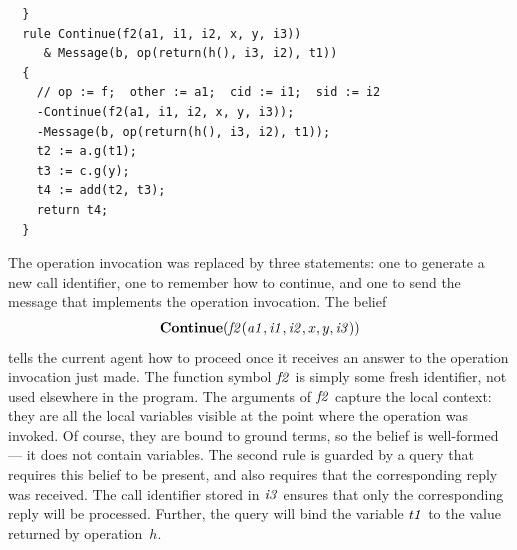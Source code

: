 \documentclass[a4paper,12pt,oneside,fleqn]{book} %
\begin{document}
\begin{example}
\begin{verbatim}
  }
  rule Continue(f2(a1, i1, i2, x, y, i3))
     & Message(b, op(return(h(), i3, i2), t1))
  {
    // op := f;  other := a1;  cid := i1;  sid := i2
    -Continue(f2(a1, i1, i2, x, y, i3));
    -Message(b, op(return(h(), i3, i2), t1));
    t2 := a.g(t1);
    t3 := c.g(y);
    t4 := add(t2, t3);
    return t4;
  }
\end{verbatim}
The operation invocation was replaced by three statements: one to generate
a new call identifier, one to remember how to continue, and one to send the
message that implements the operation invocation. The belief
\begin{align}
  {\bf Continue}
    ({\it f2}({\it a1}, {\it i1}, {\it i2}, x, y, {\it i3}))
\end{align}
tells the current agent how to proceed once it receives an answer to the
operation invocation just made. The function symbol $\it f2$ is simply some
fresh identifier, not used elsewhere in the program. The arguments of $\it
f2$ capture the local context: they are all the local variables visible at
the point where the operation was invoked. Of course, they are bound to
ground terms, so the belief is well-formed --- it does not contain
variables. The second rule is guarded by a query that requires this belief
to be present, and also requires that the corresponding reply was received.
The call identifier stored in $\it i3$ ensures that only the corresponding
reply will be processed. Further, the query will bind the variable $\it t1$
to the value returned by operation~$h$.


\end{example}
\end{document}
